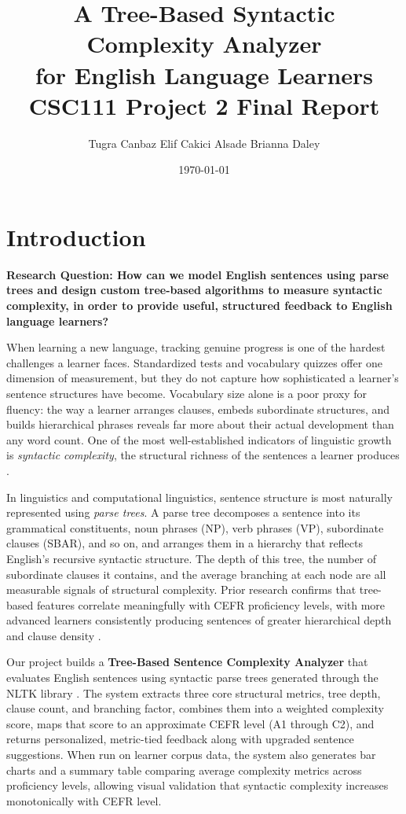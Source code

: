 \documentclass[11pt]{article}
\title{%
  \vspace{2cm}
  {\LARGE \textbf{A Tree-Based Syntactic Complexity Analyzer\\for English Language Learners}}\\[0.4em]
  {\normalsize CSC111 Project 2 Final Report}
}
\author{%
  Tugra Canbaz \quad Elif Cakici \quad Alsade Brianna Daley\\[0.3em]
}
\date{\today}
\begin{document}
 
\begin{titlepage}
  \maketitle
  \thispagestyle{empty}
\end{titlepage}
 
\setcounter{page}{1}
 
\section*{Introduction}
 
\textbf{Research Question: How can we model English sentences using parse trees and design custom tree-based algorithms to measure syntactic complexity, in order to provide useful, structured feedback to English language learners?}
 
When learning a new language, tracking genuine progress is one of the hardest challenges a learner faces. Standardized tests and vocabulary quizzes offer one dimension of measurement, but they do not capture how sophisticated a learner's sentence structures have become. Vocabulary size alone is a poor proxy for fluency: the way a learner arranges clauses, embeds subordinate structures, and builds hierarchical phrases reveals far more about their actual development than any word count. One of the most well-established indicators of linguistic growth is \textit{syntactic complexity}, the structural richness of the sentences a learner produces \cite{carla}.
 
In linguistics and computational linguistics, sentence structure is most naturally represented using \textit{parse trees}. A parse tree decomposes a sentence into its grammatical constituents, noun phrases (NP), verb phrases (VP), subordinate clauses (SBAR), and so on, and arranges them in a hierarchy that reflects English's recursive syntactic structure. The depth of this tree, the number of subordinate clauses it contains, and the average branching at each node are all measurable signals of structural complexity. Prior research confirms that tree-based features correlate meaningfully with CEFR proficiency levels, with more advanced learners consistently producing sentences of greater hierarchical depth and clause density \cite{zhang2025}.
 
Our project builds a \textbf{Tree-Based Sentence Complexity Analyzer} that evaluates English sentences using syntactic parse trees generated through the NLTK library \cite{nltk, nltk_project}. The system extracts three core structural metrics, tree depth, clause count, and branching factor, combines them into a weighted complexity score, maps that score to an approximate CEFR level (A1 through C2), and returns personalized, metric-tied feedback along with upgraded sentence suggestions. When run on learner corpus data, the system also generates bar charts and a summary table comparing average complexity metrics across proficiency levels, allowing visual validation that syntactic complexity increases monotonically with CEFR level.
 
\end{document}
